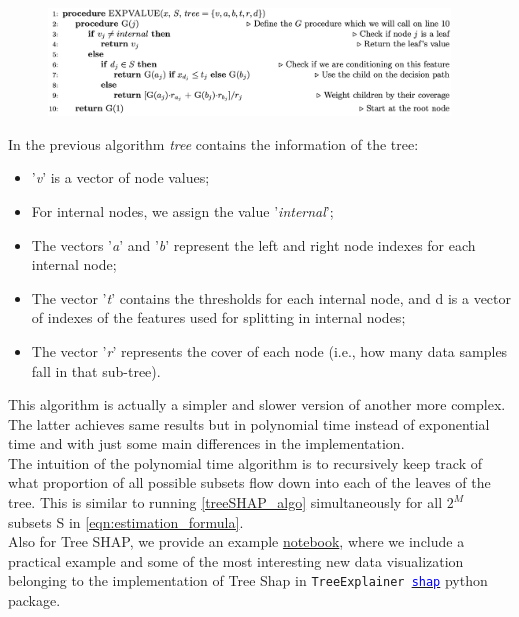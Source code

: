 \begin{algorithm}[H]
\SetAlgoLined
{}
\begin{figure}[H]
    \includegraphics[width=0.95\textwidth]{images/treeSHAP_algo.png}
\end{figure}
\caption{}
\label{treeSHAP_algo}
\end{algorithm}
In the previous algorithm \textit{tree} contains the information of the tree:
\begin{itemize}
    \item '\textit{v}' is a vector of node values; 
    \item For internal nodes, we assign the value '\textit{internal}';
    \item The vectors '\textit{a}' and '\textit{b}' represent the left and right node indexes for each internal node;
    \item The vector '\textit{t}' contains the thresholds for each internal node, and d is a vector of indexes of the features used for splitting in internal nodes;
    \item The vector '\textit{r}' represents the cover of each node (i.e., how many data samples fall in that sub-tree).
\end{itemize}
This algorithm is actually a simpler and slower version of another more complex. The latter achieves same results but in polynomial time instead of exponential time and with just some main differences in the implementation.\\
The intuition of the polynomial time algorithm is to recursively keep track of what proportion of all possible subsets flow down into each of the leaves of the tree. This is similar to running \autoref{treeSHAP_algo} simultaneously for all $2^{M}$ subsets S in \autoref{eqn:estimation_formula}.\\

Also for Tree SHAP, we provide an example \textcolor{blue}{\href{https://colab.research.google.com/drive/1Q3TipsvwM6dQQtzT-WEOCvwS5UdvUwut?usp=sharing} {notebook}}, where we include a practical example and some of the most interesting new data visualization belonging to the implementation of Tree Shap in \texttt{TreeExplainer \href{https://github.com/slundberg/shap}{\textcolor{blue}{shap}}} python package.

